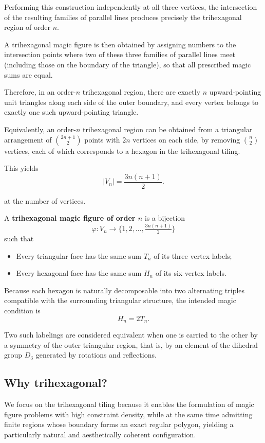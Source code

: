 \documentclass[11pt]{article}
\theoremstyle{plain}
\theoremstyle{definition}
\begin{document}
Performing this construction independently at all three vertices, the intersection of the resulting families of parallel lines produces precisely the trihexagonal region of order \(n\).

A trihexagonal magic figure is then obtained by assigning numbers to the intersection points where two of these three families of parallel lines meet (including those on the boundary of the triangle), so that all prescribed magic sums are equal.




Therefore, in an order-\(n\) trihexagonal region, there are exactly \(n\) upward-pointing unit triangles along each side of the outer boundary, and every vertex belongs to exactly one such upward-pointing triangle.

Equivalently, an order-\(n\) trihexagonal region can be obtained from a triangular arrangement of \(\binom{2n+1}{2}\) points with \(2n\) vertices on each side, by removing \(\binom{n}{2}\)   vertices, each of which corresponds to a hexagon in the trihexagonal tiling.

This yields
\[
|V_n| = \frac{3n(n+1)}{2}.
\]

at the number of vertices.


A \textbf{trihexagonal magic figure of order $n$} is a bijection
\[
\varphi:V_n\to\{1,2,\dots,\tfrac{3n(n+1)}{2}\}
\]
such that

\begin{itemize}
    \item Every triangular face has the same sum $T_n$ of its three vertex labels;
    \item Every hexagonal face has the same sum $H_n$ of its six vertex labels.
\end{itemize}
Because each hexagon is naturally decomposable into two alternating triples compatible with the surrounding triangular structure, the intended magic condition is
\[
H_n=2T_n.
\]

Two such labelings are considered equivalent when one is carried to the other by a symmetry of the outer triangular region, that is, by an element of the dihedral group $D_3$ generated by rotations and reflections.


\subsection{Why trihexagonal?}
We focus on the trihexagonal tiling because it enables the formulation of magic figure problems with high constraint density, while at the same time admitting finite regions whose boundary forms an exact regular polygon, yielding a particularly natural and aesthetically coherent configuration.
\end{document}
